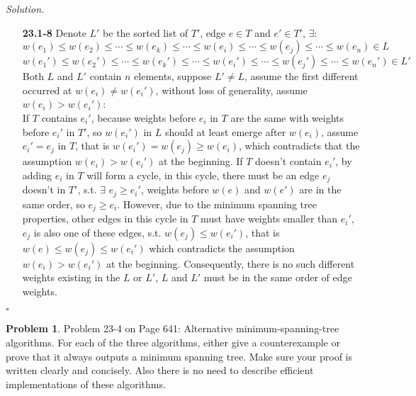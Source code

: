 \documentclass[11pt]{article}
\theoremstyle{definition}
\newtheorem{problem}{Problem}
\newenvironment{solution}{\noindent\emph{Solution.}}{\hfill$\square$}
\newcommand\tab[1][1cm]{\hspace*{#1}}
\begin{document}
\begin{solution}
\begin{enumerate}
 \item[\textbf{23.1-8}] \tab Denote $L'$ be the sorted list of $T'$, edge $e \in T$ and $e' \in T'$, $\exists$:\\
 \tab $w(e_1) \leq w(e_2) \leq \cdots \leq w(e_k) \leq \cdots \leq w(e_i) \leq \cdots \leq w(e_j) \leq \cdots \leq w(e_n) \in L$\\
  \tab $w(e_1') \leq w(e_2') \leq \cdots \leq w(e_k') \leq \cdots \leq w(e_i') \leq \cdots \leq w(e_j') \leq \cdots \leq w(e_n') \in L'$\\
  \tab Both $L$ and $L'$ contain $n$ elements, suppose $L' \neq L$, assume the first different occurred at $w(e_i) \neq w(e_i')$, without loss of generality, assume $w(e_i) > w(e_i')$:\\
  \tab If $T$ contains $e_i'$, because weights before $e_i$ in $T$ are the same with weights before $e_i'$ in $T'$, so $w(e_i')$ in $L$ should at least emerge after $w(e_i)$, assume $e_i' = e_j$ in $T$, that is $w(e_i') = w(e_j) \geq w(e_i)$, which contradicts that the assumption $w(e_i) > w(e_i')$ at the beginning.
  \tab If $T$ doesn't contain $e_i'$, by adding $e_i$ in $T$ will form a cycle, in this cycle, there must be an edge $e_j$ doesn't in $T'$, s.t.  $\exists$ $e_j \geq e_i'$, weights before $w(e)$ and $w(e')$ are in the same order, so $e_j \geq e_i$.
   However, due to the minimum spanning tree properties, other edges in this cycle in $T$ must have weights smaller than $e_i'$, $e_j$ is also one of these edges, s.t. $w(e_j) \leq w(e_i')$, that is $w(e) \leq w(e_j) \leq w(e_i')$ which contradicts the assumption $w(e_i) > w(e_i')$ at the beginning.
   \tab Consequently, there is no such different weights existing in the $L$ or $L'$,  $L$ and $L'$ must be in the same order of edge weights.
 



    
\end{enumerate}

\end{solution}

\newpage



\begin{problem}
Problem 23-4 on Page 641: Alternative minimum-spanning-tree algorithms. For each of the three algorithms, either give a counterexample or prove that it always outputs a minimum spanning tree. Make sure your proof is written clearly and concisely. Also there is no need to describe efficient implementations of these algorithms.
\end{problem}
\end{document}

